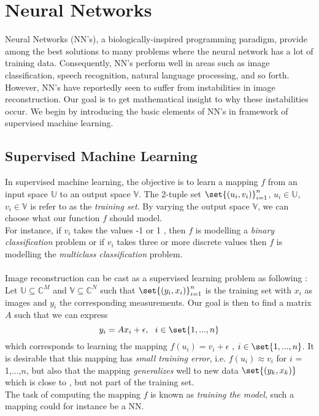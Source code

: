 \chapter{Neural Networks}

Neural Networks (NN's), a biologically-inspired programming paradigm, provide among the best solutions to many problems where the neural network has a lot of training data. Consequently, NN's perform well in areas such as image classification, speech recognition, natural language processing, and so forth. However, NN's have reportedly seen to suffer from instabilities in image reconstruction. Our goal is to get mathematical insight to why these instabilities occur. We begin by introducing the basic elements of NN's in framework of supervised machine learning. 

\section{Supervised Machine Learning}
In supervised machine learning, the objective is to learn a mapping $f$ from an input space $\mathbb{U}$ to an output space $\mathbb{V}$. The 2-tuple set 
$\set{(u_i, v_i)}^{n}_{i=1}$, $u_i \in \mathbb{U}$, $v_i \in \mathbb{V}$ is refer to as the \emph{training set}.  By varying the output space $\mathbb{V}$, we can choose what our function $f$ should model. \\For instance, if $v_i$ takes the values -1 or 1 , then $f$ is modelling  a \emph{binary classification} problem or if $v_i$ takes three or more discrete values then $f$ is modelling the \emph{multiclass classification} problem. \\ \\
Image reconstruction can be cast as a supervised learning problem as following : Let $\mathbb{U} \subseteq \mathbb{C}^M$ and $\mathbb{V} \subseteq \mathbb{C}^N$ such that $\set{(y_i, x_i)}^{n}_{i=1}$ is the training set with $x_i$ as images and $y_i$ the corresponding measurements. Our goal is then to find a matrix $A$ such that we can express 
\begin{equation*}
y_i = Ax_i + \epsilon ,\  \ i \in \set{1,...,n}
\end{equation*}
which corresponds to learning the mapping $f(u_i) = v_i + \epsilon$ , $ i \in \set{1,...,n}$. It is desirable that this mapping has \emph{small training error}, i.e. $f(u_i) \approx v_i$  for $i$ = 1,...,$n$, but also that the mapping \emph{generalizes} well to new data $\set{(y_k, x_k)}$ which is close to , but not part of the training set.\\ The task of computing the mapping $f$ is known as \emph{training the model}, such a mapping could for instance be a NN.

